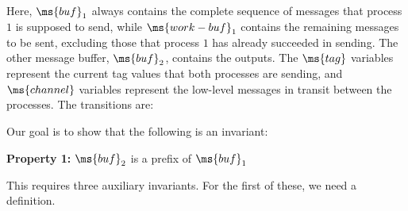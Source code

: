 Here, $\ms{buf}_1$ always contains the complete sequence of messages
that process $1$ is supposed to send, while $\ms{work-buf}_1$
contains the remaining messages to be sent, excluding those that
process $1$ has already succeeded in sending. 
The other message buffer, $\ms{buf}_2$, contains the outputs.
The $\ms{tag}$ variables represent the current tag values that both
processes are sending, and $\ms{channel}$ variables represent the
low-level messages in transit between the processes.
The transitions are:


Our goal is to show that the following is an invariant:

{\bf Property 1:}
$\ms{buf}_2$ is a prefix of $\ms{buf}_1$ 

This requires three auxiliary invariants.
For the first of these, we need a definition.

